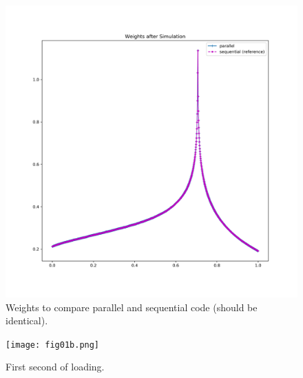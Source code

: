 \documentclass[10pt]{article}
\begin{document}
\begin{figure}[htb]
    \centering
    \includegraphics[width=\textwidth]{fig_weights.png}
    \caption{Weights to compare parallel and sequential code (should be identical).}
    \label{fig:weights}
\end{figure}

\begin{figure}[h]
    \centering
    \texttt{[image: fig01b.png]}
    \caption{First second of loading.}
    \label{fig:loadingb}
\end{figure}
\end{document}
